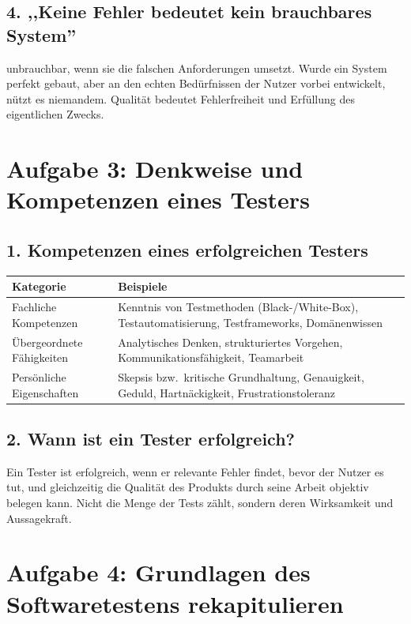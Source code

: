 \documentclass[
	fontsize=12pt,          %
	paper=a4,               %
	numbers=noenddot,       %
	listof=totoc,           %
	listof=entryprefix,     %
	listof=nochaptergap,    %
	bibliography=totoc,     %
	parskip=half,           %
	openany                 %
]{scrbook}
\begin{document}
\section*{4. ,,Keine Fehler bedeutet kein brauchbares System''}
unbrauchbar, wenn sie die falschen Anforderungen umsetzt.
Wurde ein System perfekt gebaut, aber an den echten Bedürfnissen der Nutzer vorbei entwickelt, nützt es niemandem.
Qualität bedeutet Fehlerfreiheit und Erfüllung des eigentlichen Zwecks.


\chapter*{Aufgabe 3: Denkweise und Kompetenzen eines Testers}


\section*{1. Kompetenzen eines erfolgreichen Testers}
\begin{tabularx}{\textwidth}{@{} l X @{}}
    \toprule
	\textbf{Kategorie} & \textbf{Beispiele} \\
	\midrule
	Fachliche Kompetenzen &
	Kenntnis von Testmethoden (Black-/White-Box), Testautomatisierung,
	Testframeworks, Domänenwissen \\[6pt]
	Übergeordnete Fähigkeiten &
	Analytisches Denken, strukturiertes Vorgehen, Kommunikationsfähigkeit,
	Teamarbeit \\[6pt]
	Persönliche Eigenschaften &
	Skepsis bzw.\ kritische Grundhaltung, Genauigkeit, Geduld,
	Hartnäckigkeit, Frustrationstoleranz \\
	\bottomrule
\end{tabularx}


\section*{2. Wann ist ein Tester erfolgreich?}
Ein Tester ist erfolgreich, wenn er relevante Fehler findet, bevor der Nutzer es tut, und gleichzeitig die Qualität des Produkts durch seine Arbeit objektiv belegen kann.
Nicht die Menge der Tests zählt, sondern deren Wirksamkeit und Aussagekraft.

\chapter*{Aufgabe 4: Grundlagen des Softwaretestens rekapitulieren}
\end{document}
